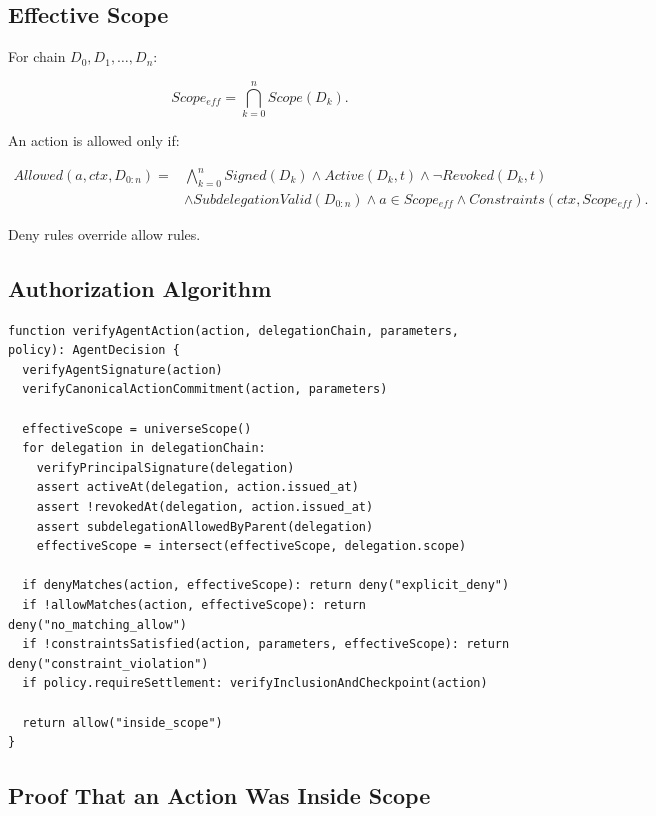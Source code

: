 \documentclass[11pt]{article}
\begin{document}
\subsection{Effective Scope}

For chain \(D_0,D_1,\ldots,D_n\):

\begin{equation}
Scope_{eff}=\bigcap_{k=0}^{n}Scope(D_k).
\end{equation}

An action is allowed only if:

\begin{align}
Allowed(a,ctx,D_{0:n})={}&\bigwedge_{k=0}^{n}Signed(D_k)\land Active(D_k,t)\land \neg Revoked(D_k,t)\\
&\land SubdelegationValid(D_{0:n})\land a\in Scope_{eff}\land Constraints(ctx,Scope_{eff}).
\end{align}

Deny rules override allow rules.

\subsection{Authorization Algorithm}

\begin{lstlisting}[style=tslcode]
function verifyAgentAction(action, delegationChain, parameters, policy): AgentDecision {
  verifyAgentSignature(action)
  verifyCanonicalActionCommitment(action, parameters)

  effectiveScope = universeScope()
  for delegation in delegationChain:
    verifyPrincipalSignature(delegation)
    assert activeAt(delegation, action.issued_at)
    assert !revokedAt(delegation, action.issued_at)
    assert subdelegationAllowedByParent(delegation)
    effectiveScope = intersect(effectiveScope, delegation.scope)

  if denyMatches(action, effectiveScope): return deny("explicit_deny")
  if !allowMatches(action, effectiveScope): return deny("no_matching_allow")
  if !constraintsSatisfied(action, parameters, effectiveScope): return deny("constraint_violation")
  if policy.requireSettlement: verifyInclusionAndCheckpoint(action)

  return allow("inside_scope")
}
\end{lstlisting}

\subsection{Proof That an Action Was Inside Scope}
\end{document}
